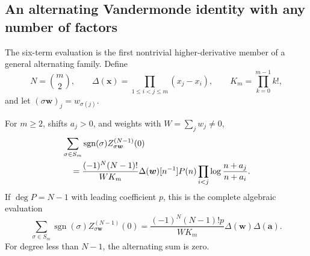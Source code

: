 \subsection{An alternating Vandermonde identity with any number of factors}

The six-term evaluation is the first nontrivial higher-derivative member
of a general alternating family. Define
\[
 N=\binom m2,\qquad
 \Delta(\boldsymbol x)=\prod_{1\le i<j\le m}(x_j-x_i),\qquad
 K_m=\prod_{k=0}^{m-1}k!,
\]
and let $(\sigma\boldsymbol w)_j=w_{\sigma(j)}$.

\begin{theorem}\label{sp:thm:alternant}
For $m\ge2$, shifts $a_j>0$, and weights with $W=\sum_jw_j\ne0$,
\begin{align}\label{sp:alternant}
 &\sum_{\sigma\in S_m}\operatorname{sgn}(\sigma)
       Z_{\sigma\boldsymbol w}^{(N-1)}(0)\notag\\
 &\quad=\frac{(-1)^N(N-1)!}{WK_m}\Delta(\boldsymbol w)
     [n^{-1}]P(n)\prod_{i<j}\log\frac{n+a_j}{n+a_i}.
\end{align}
If $\deg P=N-1$ with leading coefficient $p$, this is the complete
algebraic evaluation
\begin{equation}\label{sp:alternant-leading}
 \boxed{\sum_{\sigma\in S_m}\operatorname{sgn}(\sigma)
       Z_{\sigma\boldsymbol w}^{(N-1)}(0)
 =\frac{(-1)^N(N-1)!p}{WK_m}
                 \Delta(\boldsymbol w)\Delta(\boldsymbol a).}
\end{equation}
For degree less than $N-1$, the alternating sum is zero.
\end{theorem}

